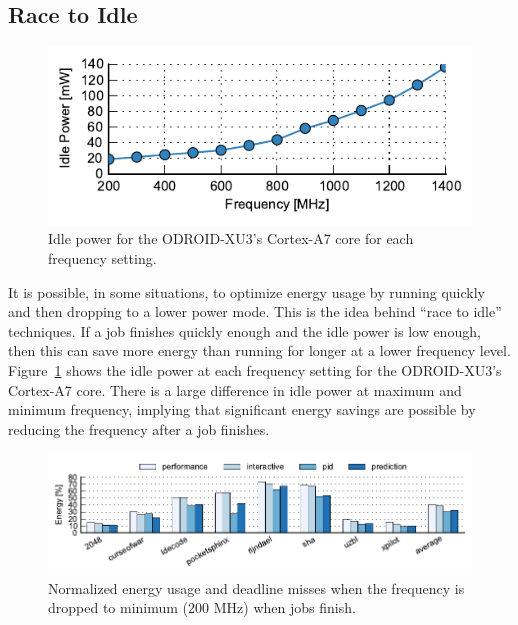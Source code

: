 \subsection{Race to Idle}

\begin{figure}
  \begin{center}
    \includegraphics{exec_time_prediction/data/idle_power.pdf}
    \caption{Idle power for the ODROID-XU3's Cortex-A7 core for each frequency
    setting.}
    \label{fig:exec_time_prediction.evaluation.idle_power}
  \end{center}
\end{figure}

It is possible, in some situations, to optimize energy usage by running quickly
and then dropping to a lower power mode. This is the idea behind ``race to
idle'' techniques.  If a job finishes quickly enough and the idle power is low
enough, then this can save more energy than running for longer at a lower
frequency level.  Figure~\ref{fig:exec_time_prediction.evaluation.idle_power}
shows the idle power at each frequency setting for the ODROID-XU3's Cortex-A7
core.  There is a large difference in idle power at maximum and minimum
frequency, implying that significant energy savings are possible by reducing
the frequency after a job finishes.

\begin{figure}
  \begin{center}
    \includegraphics{exec_time_prediction/data/em_summary_idle.pdf}
    \caption{Normalized energy usage and deadline misses when the frequency is
    dropped to minimum (200 MHz) when jobs finish.}
    \label{fig:exec_time_prediction.evaluation.em_summary_idle}
  \end{center}
\end{figure}

